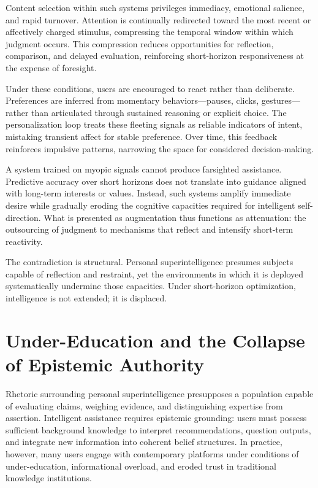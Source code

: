 \documentclass[12pt]{article}
\begin{document}
Content selection within such systems privileges immediacy, emotional salience, and rapid turnover. Attention is continually redirected toward the most recent or affectively charged stimulus, compressing the temporal window within which judgment occurs. This compression reduces opportunities for reflection, comparison, and delayed evaluation, reinforcing short-horizon responsiveness at the expense of foresight.

Under these conditions, users are encouraged to react rather than deliberate. Preferences are inferred from momentary behaviors—pauses, clicks, gestures—rather than articulated through sustained reasoning or explicit choice. The personalization loop treats these fleeting signals as reliable indicators of intent, mistaking transient affect for stable preference. Over time, this feedback reinforces impulsive patterns, narrowing the space for considered decision-making.

A system trained on myopic signals cannot produce farsighted assistance. Predictive accuracy over short horizons does not translate into guidance aligned with long-term interests or values. Instead, such systems amplify immediate desire while gradually eroding the cognitive capacities required for intelligent self-direction. What is presented as augmentation thus functions as attenuation: the outsourcing of judgment to mechanisms that reflect and intensify short-term reactivity.

The contradiction is structural. Personal superintelligence presumes subjects capable of reflection and restraint, yet the environments in which it is deployed systematically undermine those capacities. Under short-horizon optimization, intelligence is not extended; it is displaced.

\section{Under-Education and the Collapse of Epistemic Authority}

Rhetoric surrounding personal superintelligence presupposes a population capable of evaluating claims, weighing evidence, and distinguishing expertise from assertion. Intelligent assistance requires epistemic grounding: users must possess sufficient background knowledge to interpret recommendations, question outputs, and integrate new information into coherent belief structures. In practice, however, many users engage with contemporary platforms under conditions of under-education, informational overload, and eroded trust in traditional knowledge institutions.
\end{document}

